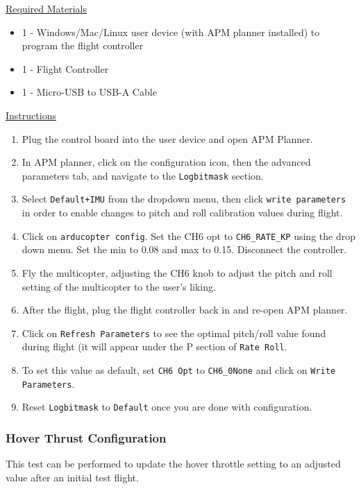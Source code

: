 \documentclass[10pt,letterpaper]{article}
\begin{document}
\underline{Required Materials}
\begin{itemize}
    \item 1 - Windows/Mac/Linux user device (with APM planner installed) to program the flight controller 
\item 1 - Flight Controller
\item 1 - Micro-USB to USB-A Cable
\end{itemize}

\underline{Instructions}
\begin{enumerate}
	\item Plug the control board into the user device and open APM Planner.
    \item In APM planner, click on the configuration icon, then the advanced parameters tab, and navigate to the \texttt{Logbitmask} section. 
    \item Select \texttt{Default+IMU} from the dropdown menu, then click \texttt{write parameters} in order to enable changes to pitch and roll calibration values during flight.
    \item Click on \texttt{arducopter config}. Set the CH6 opt to \texttt{CH6\_RATE\_KP} using the drop down menu. Set the min to 0.08 and max to 0.15. Disconnect the controller.
    \item Fly the multicopter, adjusting the CH6 knob to adjust the pitch and roll setting of the multicopter to the user's liking. 
    \item After the flight, plug the flight controller back in and re-open APM planner. 
    \item Click on \texttt{Refresh Parameters} to see the optimal pitch/roll value found during flight (it will appear under the P section of \texttt{Rate Roll}. 
    \item To set this value as default, set \texttt{CH6 Opt} to \texttt{CH6\_0None} and click on \texttt{Write Parameters}.
    \item Reset \texttt{Logbitmask} to \texttt{Default} once you are done with configuration.

\end{enumerate}

\subsubsection{Hover Thrust Configuration}

This test can be performed to update the hover throttle setting to an adjusted value after an initial test flight.
\end{document}
